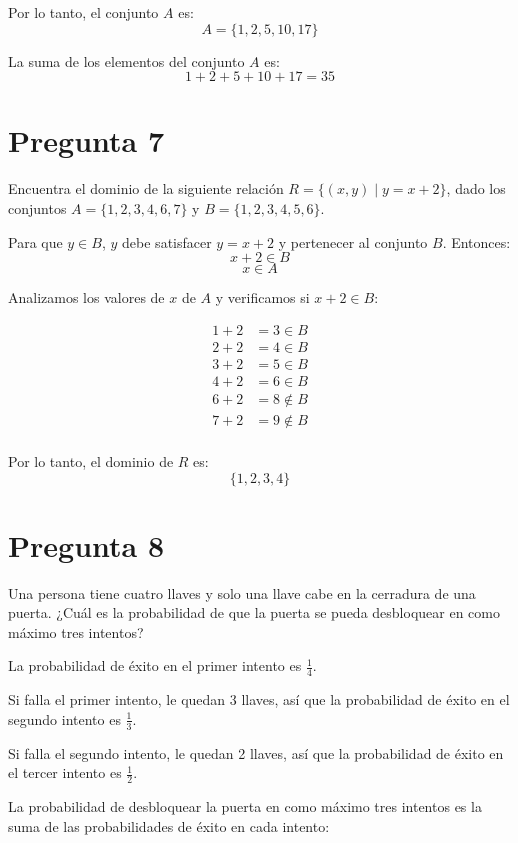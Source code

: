 \documentclass{article}
\begin{document}
Por lo tanto, el conjunto \( A \) es:
\[ A = \{1, 2, 5, 10, 17\} \]

La suma de los elementos del conjunto \( A \) es:
\[ 1 + 2 + 5 + 10 + 17 = 35 \]

\section*{Pregunta 7}

Encuentra el dominio de la siguiente relación \( R = \{(x, y) \mid y = x + 2\} \), dado los conjuntos \( A = \{1, 2, 3, 4, 6, 7\} \) y \( B = \{1, 2, 3, 4, 5, 6\} \).

Para que \( y \in B \), \( y \) debe satisfacer \( y = x + 2 \) y pertenecer al conjunto \( B \). Entonces:
\[ x + 2 \in B \]
\[ x \in A \]

Analizamos los valores de \( x \) de \( A \) y verificamos si \( x + 2 \in B \):

\[ 
\begin{align*}
1 + 2 & = 3 \in B \\
2 + 2 & = 4 \in B \\
3 + 2 & = 5 \in B \\
4 + 2 & = 6 \in B \\
6 + 2 & = 8 \notin B \\
7 + 2 & = 9 \notin B \\
\end{align*}
\]

Por lo tanto, el dominio de \( R \) es:
\[ \{1, 2, 3, 4\} \]

\section*{Pregunta 8}

Una persona tiene cuatro llaves y solo una llave cabe en la cerradura de una puerta. ¿Cuál es la probabilidad de que la puerta se pueda desbloquear en como máximo tres intentos?

La probabilidad de éxito en el primer intento es \( \frac{1}{4} \).

Si falla el primer intento, le quedan 3 llaves, así que la probabilidad de éxito en el segundo intento es \( \frac{1}{3} \).

Si falla el segundo intento, le quedan 2 llaves, así que la probabilidad de éxito en el tercer intento es \( \frac{1}{2} \).

La probabilidad de desbloquear la puerta en como máximo tres intentos es la suma de las probabilidades de éxito en cada intento:
\end{document}
